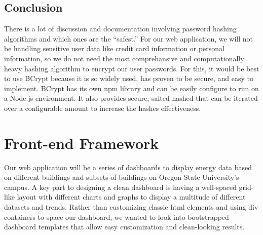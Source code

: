 \documentclass[onecolumn, draftclsnofoot,10pt, compsoc]{IEEEtran}
\begin{document}
\subsection{Conclusion}
There is a lot of discussion and documentation involving password hashing algorithms and which ones are the ``safest.'' For our web application, we will not be handling sensitive user data like credit card information or personal information, so we do not need the most comprehansive and computationally heavy hashing algorithm to encrypt our user passwords. For this, it would be best to use BCrypt because it is so widely used, has proven to be secure, and easy to implement. BCrypt has its own npm library and can be easily configure to run on a Node.js environment. It also provides secure, salted hashed that can be iterated over a configurable amount to increase the hashes effectiveness.
\section{Front-end Framework}
Our web application will be a series of dashboards to display energy data based on different buildings and subsets of buildings on Oregon State University's campus. A key part to designing a clean dashboard is having a well-spaced grid-like layout with different charts and graphs to display a multitude of different datasets and trends. Rather than customizing classic html elements and using div containers to space our dashboard, we wanted to look into bootstrapped dashboard templates that allow easy customization and clean-looking results. 
\end{document}
